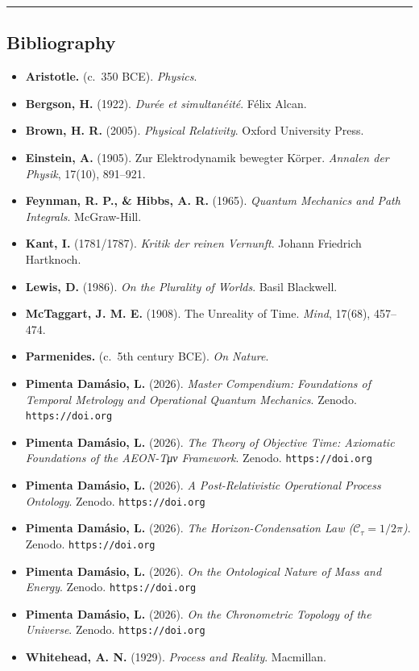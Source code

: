 \documentclass[
]{article}
\providecommand{\tightlist}{%
  \setlength{\itemsep}{0pt}\setlength{\parskip}{0pt}}
\begin{document}
\begin{center}\rule{0.5\linewidth}{0.5pt}\end{center}

\subsection{Bibliography}\label{bibliography}

\begin{itemize}
\tightlist
\item
  \textbf{Aristotle.} (c.~350 BCE). \emph{Physics}.
\item
  \textbf{Bergson, H.} (1922). \emph{Durée et simultanéité}. Félix
  Alcan.
\item
  \textbf{Brown, H. R.} (2005). \emph{Physical Relativity}. Oxford
  University Press.
\item
  \textbf{Einstein, A.} (1905). Zur Elektrodynamik bewegter Körper.
  \emph{Annalen der Physik}, 17(10), 891--921.
\item
  \textbf{Feynman, R. P., \& Hibbs, A. R.} (1965). \emph{Quantum
  Mechanics and Path Integrals}. McGraw-Hill.
\item
  \textbf{Kant, I.} (1781/1787). \emph{Kritik der reinen Vernunft}.
  Johann Friedrich Hartknoch.
\item
  \textbf{Lewis, D.} (1986). \emph{On the Plurality of Worlds}. Basil
  Blackwell.
\item
  \textbf{McTaggart, J. M. E.} (1908). The Unreality of Time.
  \emph{Mind}, 17(68), 457--474.
\item
  \textbf{Parmenides.} (c.~5th century BCE). \emph{On Nature}.
\item
  \textbf{Pimenta Damásio, L.} (2026). \emph{Master Compendium:
  Foundations of Temporal Metrology and Operational Quantum Mechanics}.
  Zenodo. \texttt{https://doi.org}
\item
  \textbf{Pimenta Damásio, L.} (2026). \emph{The Theory of Objective
  Time: Axiomatic Foundations of the AEON-Tμν Framework}. Zenodo.
  \texttt{https://doi.org}
\item
  \textbf{Pimenta Damásio, L.} (2026). \emph{A Post-Relativistic
  Operational Process Ontology}. Zenodo. \texttt{https://doi.org}
\item
  \textbf{Pimenta Damásio, L.} (2026). \emph{The Horizon-Condensation
  Law (\(\mathcal{C}_\tau = 1/2\pi\))}. Zenodo. \texttt{https://doi.org}
\item
  \textbf{Pimenta Damásio, L.} (2026). \emph{On the Ontological Nature
  of Mass and Energy}. Zenodo. \texttt{https://doi.org}
\item
  \textbf{Pimenta Damásio, L.} (2026). \emph{On the Chronometric
  Topology of the Universe}. Zenodo. \texttt{https://doi.org}
\item
  \textbf{Whitehead, A. N.} (1929). \emph{Process and Reality}.
  Macmillan.
\end{itemize}
\end{document}
